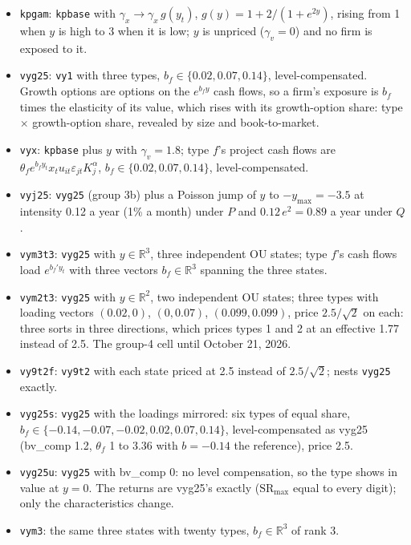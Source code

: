 \documentclass[11pt]{article}
\begin{document}
\begin{itemize}
\item \texttt{kpgam}: \texttt{kpbase} with $\gamma_x\to\gamma_x\,g(y_t)$, $g(y)=1+2/(1+e^{2y})$, rising from 1 when $y$ is high to 3 when it is low; $y$ is unpriced ($\gamma_v=0$) and no firm is exposed to it.
\item \texttt{vyg25}: \texttt{vy1} with three types, $b_f\in\{0.02,0.07,0.14\}$, level-compensated. Growth options are options on the $e^{b_f y}$ cash flows, so a firm's exposure is $b_f$ times the elasticity of its value, which rises with its growth-option share: type $\times$ growth-option share, revealed by size and book-to-market.
\item \texttt{vyx}: \texttt{kpbase} plus $y$ with $\gamma_v=1.8$; type $f$'s project cash flows are $\theta_f e^{b_f y_t}x_t u_{it}\varepsilon_{jt}K_j^\alpha$, $b_f\in\{0.02,0.07,0.14\}$, level-compensated.
\item \texttt{vyj25}: \texttt{vyg25} (group 3b) plus a Poisson jump of $y$ to $-y_{\max}=-3.5$ at intensity 0.12 a year (1\% a month) under $P$ and $0.12\,e^{2}=0.89$ a year under $Q$.
\item \texttt{vym3t3}: \texttt{vyg25} with $y\in\mathbb{R}^3$, three independent OU states; type $f$'s cash flows load $e^{b_f'y_t}$ with three vectors $b_f\in\mathbb{R}^3$ spanning the three states.
\item \texttt{vym2t3}: \texttt{vyg25} with $y\in\mathbb{R}^2$, two independent OU states; three types with loading vectors $(0.02,0)$, $(0,0.07)$, $(0.099,0.099)$, price $2.5/\sqrt2$ on each: three sorts in three directions, which prices types 1 and 2 at an effective 1.77 instead of 2.5. The group-4 cell until October 21, 2026.
\item \texttt{vy9t2f}: \texttt{vy9t2} with each state priced at 2.5 instead of $2.5/\sqrt2$; nests \texttt{vyg25} exactly.
\item \texttt{vyg25s}: \texttt{vyg25} with the loadings mirrored: six types of equal share, $b_f\in\{-0.14,-0.07,-0.02,0.02,0.07,0.14\}$, level-compensated as vyg25 (bv\_comp 1.2, $\theta_f$ 1 to 3.36 with $b=-0.14$ the reference), price 2.5.
\item \texttt{vyg25u}: \texttt{vyg25} with bv\_comp 0: no level compensation, so the type shows in value at $y=0$. The returns are vyg25's exactly ($\mathrm{SR}_{\max}$ equal to every digit); only the characteristics change.
\item \texttt{vym3}: the same three states with twenty types, $b_f\in\mathbb{R}^3$ of rank 3.
\end{itemize}
\end{document}
